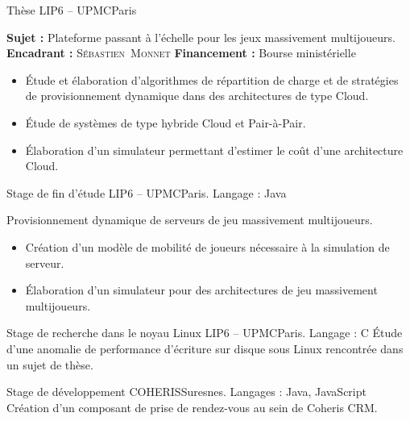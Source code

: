 \documentclass[11pt,a4paper,sans]{moderncv}
\begin{document}
        {Thèse}
        {LIP6 -- UPMC}{Paris}{}
        {
            \textbf{Sujet :} Plateforme passant à l'échelle pour les jeux massivement multijoueurs.\endgraf
            \textbf{Encadrant :} \textsc{Sébastien~Monnet}\hfill
            \textbf{Financement :} Bourse ministérielle\hfill~\endgraf
            \begin{itemize}
                \item\'Etude et élaboration d'algorithmes de répartition de charge et de stratégies de provisionnement dynamique dans des architectures de type Cloud.
                \item\'Etude de systèmes de type hybride Cloud et Pair-à-Pair.
                \item\'Elaboration d'un simulateur permettant d'estimer le coût d'une architecture Cloud.
            \end{itemize}
        }

\vspace{1em}

        {Stage de fin d'étude}
        {LIP6 -- UPMC}{Paris. Langage : Java}{}
        {
            Provisionnement dynamique de serveurs de jeu massivement multijoueurs.
            \begin{itemize}
                \item Création d'un modèle de mobilité de joueurs nécessaire à la simulation de serveur.
                \item\'Elaboration d'un simulateur pour des architectures de jeu massivement multijoueurs.
            \end{itemize}
        }

\vspace{1em}

        {Stage de recherche dans le noyau Linux}
        {LIP6 -- UPMC}{Paris. Langage : C}{}
        {
            \'Etude d'une anomalie de performance d'écriture sur disque sous Linux rencontrée dans un sujet de thèse.
        }

\vspace{1em}

        {Stage de développement}
        {COHERIS}{Suresnes. Langages : Java, JavaScript}{}
        {
            Création d'un composant de prise de rendez-vous au sein de Coheris CRM.
        }

\vspace{0.5em}
\end{document}
